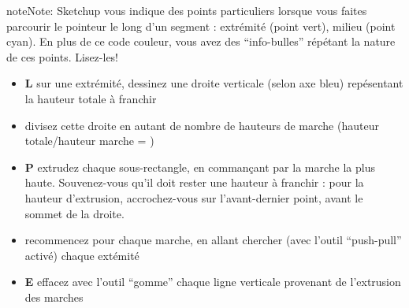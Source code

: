 \documentclass[a4paper,12pt,french]{sphinxmanual}
\begin{document}
\begin{notice}{note}{Note:}
Sketchup vous indique des points particuliers lorsque vous faites parcourir le pointeur le long d'un segment : extrémité (point vert), milieu (point cyan). En plus de ce code couleur, vous avez des ``info-bulles'' répétant la nature de ces points. Lisez-les!
\end{notice}
\begin{itemize}
\item {} 
\textbf{L} sur une extrémité, dessinez une droite verticale (selon axe bleu) repésentant la hauteur totale à franchir

\item {} 
divisez cette droite en autant de nombre de hauteurs de marche (hauteur totale/hauteur marche = )

\item {} 
\textbf{P} extrudez chaque sous-rectangle, en commançant par la marche la plus haute. Souvenez-vous qu'il doit rester une hauteur à franchir : pour la hauteur d'extrusion, accrochez-vous sur l'avant-dernier point, avant le sommet de la droite.

\item {} 
recommencez pour chaque marche, en allant chercher (avec l'outil ``push-pull'' activé) chaque extémité

\item {} 
\textbf{E} effacez avec l'outil ``gomme'' chaque ligne verticale provenant de l'extrusion des marches

\end{itemize}
\end{document}
